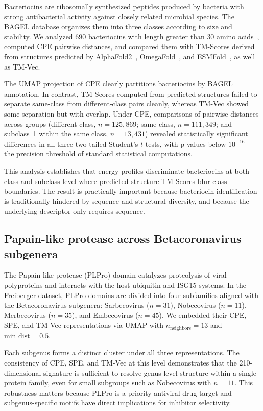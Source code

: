 \documentclass[11pt]{article}
\begin{document}
Bacteriocins are ribosomally synthesized peptides produced by bacteria with
strong antibacterial activity against closely related microbial species.
The BAGEL database organizes them into three classes according to size and
stability. We analyzed $690$ bacteriocins with length greater than $30$
amino acids~\citep{alkhalili2018bagel}, computed CPE pairwise distances,
and compared them with TM-Scores derived from structures predicted by
AlphaFold2~\citep{jumper2021alphafold}, OmegaFold~\citep{wu2022omegafold},
and ESMFold~\citep{lin2023esmfold}, as well as TM-Vec.

The UMAP projection of CPE clearly partitions bacteriocins by BAGEL
annotation. In contrast, TM-Scores computed from predicted structures
failed to separate same-class from different-class pairs cleanly, whereas
TM-Vec showed some separation but with overlap. Under CPE, comparisons of
pairwise distances across groups (different class, $n=125{,}869$; same
class, $n=111{,}349$; and subclass~1 within the same class, $n=13{,}431$)
revealed statistically significant differences in all three two-tailed
Student's $t$-tests, with p-values below $10^{-16}$---the precision
threshold of standard statistical computations.

This analysis establishes that energy profiles discriminate bacteriocins at
both class and subclass level where predicted-structure TM-Scores blur
class boundaries. The result is practically important because bacteriocin
identification is traditionally hindered by sequence and structural
diversity, and because the underlying descriptor only requires sequence.

\subsection{Papain-like protease across Betacoronavirus subgenera}

The Papain-like protease (PLPro) domain catalyzes proteolysis of viral
polyproteins and interacts with the host ubiquitin and ISG15 systems. In
the Freiberger dataset, PLPro domains are divided into four subfamilies
aligned with the Betacoronavirus subgenera: Sarbecovirus ($n=31$),
Nobecovirus ($n=11$), Merbecovirus ($n=35$), and Embecovirus ($n=45$).
We embedded their CPE, SPE, and TM-Vec representations via UMAP with
$n_\text{neighbors}=13$ and $\text{min\_dist}=0.5$.

Each subgenus forms a distinct cluster under all three representations.
The consistency of CPE, SPE, and TM-Vec at this level demonstrates that the
210-dimensional signature is sufficient to resolve genus-level structure
within a single protein family, even for small subgroups such as
Nobecovirus with $n=11$. This robustness matters because PLPro is a priority
antiviral drug target and subgenus-specific motifs have direct implications
for inhibitor selectivity.
\end{document}
